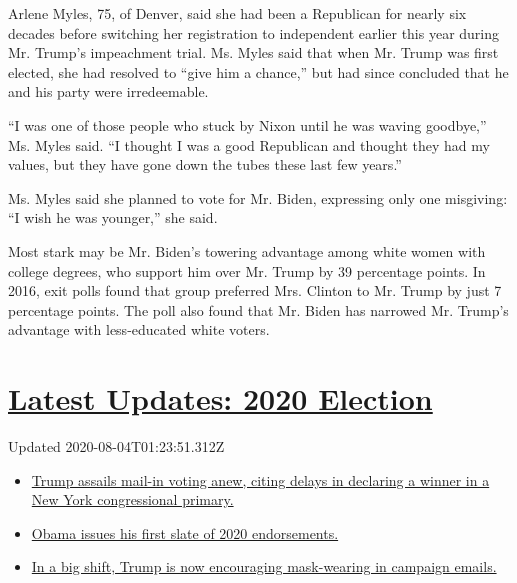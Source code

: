 Arlene Myles, 75, of Denver, said she had been a Republican for nearly
six decades before switching her registration to independent earlier
this year during Mr. Trump's impeachment trial. Ms. Myles said that when
Mr. Trump was first elected, she had resolved to ``give him a chance,''
but had since concluded that he and his party were irredeemable.

``I was one of those people who stuck by Nixon until he was waving
goodbye,'' Ms. Myles said. ``I thought I was a good Republican and
thought they had my values, but they have gone down the tubes these last
few years.''

Ms. Myles said she planned to vote for Mr. Biden, expressing only one
misgiving: ``I wish he was younger,'' she said.

Most stark may be Mr. Biden's towering advantage among white women with
college degrees, who support him over Mr. Trump by 39 percentage points.
In 2016, exit polls found that group preferred Mrs. Clinton to Mr. Trump
by just 7 percentage points. The poll also found that Mr. Biden has
narrowed Mr. Trump's advantage with less-educated white voters.

\hypertarget{latest-updates-2020-election}{%
\section{\texorpdfstring{\href{https://www.nytimes.com/2020/08/03/us/elections/biden-vs-trump.html?action=click\&pgtype=Article\&state=default\&region=MAIN_CONTENT_1\&context=storylines_live_updates}{Latest
Updates: 2020
Election}}{Latest Updates: 2020 Election}}\label{latest-updates-2020-election}}

Updated 2020-08-04T01:23:51.312Z

\begin{itemize}
\tightlist
\item
  \href{https://www.nytimes.com/2020/08/03/us/elections/biden-vs-trump.html?action=click\&pgtype=Article\&state=default\&region=MAIN_CONTENT_1\&context=storylines_live_updates\#link-6494b448}{Trump
  assails mail-in voting anew, citing delays in declaring a winner in a
  New York congressional primary.}
\item
  \href{https://www.nytimes.com/2020/08/03/us/elections/biden-vs-trump.html?action=click\&pgtype=Article\&state=default\&region=MAIN_CONTENT_1\&context=storylines_live_updates\#link-3de249e6}{Obama
  issues his first slate of 2020 endorsements.}
\item
  \href{https://www.nytimes.com/2020/08/03/us/elections/biden-vs-trump.html?action=click\&pgtype=Article\&state=default\&region=MAIN_CONTENT_1\&context=storylines_live_updates\#link-54e34d20}{In
  a big shift, Trump is now encouraging mask-wearing in campaign
  emails.}
\end{itemize}

